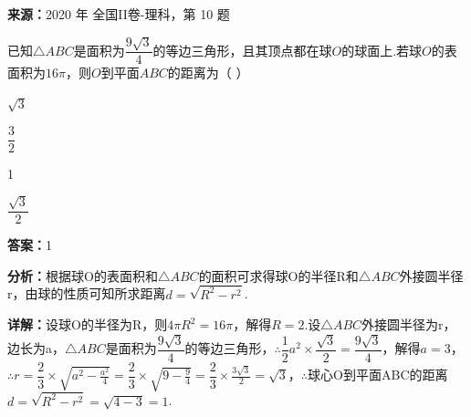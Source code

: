 \begin{question}[points=5]
\textbf{来源：}2020 年 全国II卷-理科，第 10 题\par
已知$\triangle ABC$是面积为$\dfrac{9\sqrt3}{4}$的等边三角形，且其顶点都在球$O$的球面上.若球$O$的表面积为$16\pi$，则$O$到平面$ABC$的距离为（ ）
\begin{choices}
  \item $\sqrt3$
  \item $\dfrac{3}{2}$
  \item 1
  \item $\dfrac{\sqrt3}{2}$
\end{choices}
\begin{solution}
\textbf{答案：}1

\textbf{分析：}根据球O的表面积和$\triangle ABC$的面积可求得球O的半径R和$\triangle ABC$外接圆半径r，由球的性质可知所求距离$d=\sqrt{R^2-r^2}$.

\textbf{详解：}设球O的半径为R，则$4\pi R^2=16\pi$，解得$R=2$.设$\triangle ABC$外接圆半径为r，边长为a，$\triangle ABC$是面积为$\dfrac{9\sqrt3}{4}$的等边三角形，$\therefore\dfrac12 a^2\times\dfrac{\sqrt3}{2}=\dfrac{9\sqrt3}{4}$，解得$a=3$，$\therefore r=\dfrac23\times\sqrt{a^2-\frac{a^2}{4}}=\dfrac23\times\sqrt{9-\frac94}=\dfrac23\times\frac{3\sqrt3}{2}=\sqrt3$，$\therefore$球心O到平面ABC的距离$d=\sqrt{R^2-r^2}=\sqrt{4-3}=1$.
\end{solution}
\end{question}

